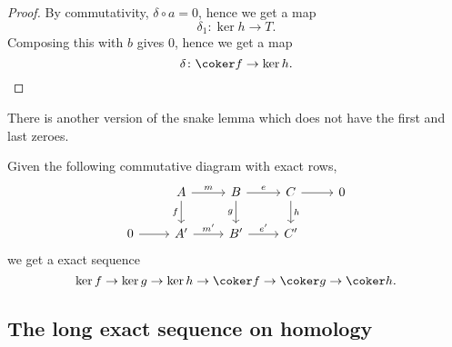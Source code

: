 \documentclass[main.tex]{subfiles}
\begin{document}
\begin{proof}
  By commutativity, $\delta \circ a = 0$, hence we get a map
  \begin{equation*}
    \delta_{1}\colon \ker h \to T.
  \end{equation*}
  Composing this with $b$ gives $0$, hence we get a map
  \begin{equation*}
    \delta\colon \coker f \to \ker h.
  \end{equation*}
\end{proof}

There is another version of the snake lemma which does not have the first and last zeroes.
\begin{theorem}
  \label{thm:snake_lemma_ii}
  Given the following commutative diagram with exact rows,
  \begin{equation*}
    \begin{tikzcd}
      & A
      \arrow[d, swap, "f"]
      \arrow[r, "m"]
      & B
      \arrow[r, "e"]
      \arrow[d, swap, "g"]
      & C
      \arrow[r]
      \arrow[d, "h"]
      & 0
      \\
      0
      \arrow[r]
      & A'
      \arrow[r, "m'"]
      & B'
      \arrow[r, "e'"]
      & C'
    \end{tikzcd}
  \end{equation*}
  we get a exact sequence
  \begin{equation*}
    \ker f \to \ker g \to \ker h \to \coker f \to \coker g \to \coker h.
  \end{equation*}
\end{theorem}

\subsection{The long exact sequence on homology}
\label{ssc:the_long_exact_sequence_on_homology}
\end{document}
